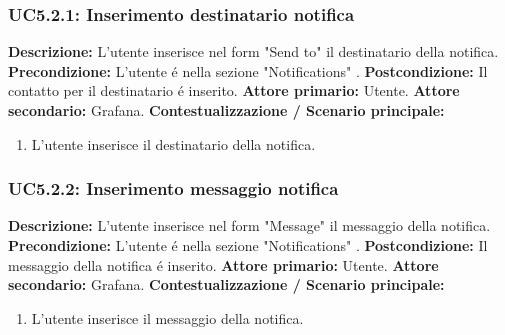                 \subsubsection{UC5.2.1: Inserimento destinatario notifica }
                    \textbf{Descrizione:} L’utente inserisce nel form "Send to" il destinatario della notifica.
                    \newline
                    \textbf{Precondizione:} L'utente é nella sezione "Notifications" .
                    \newline
                    \textbf{Postcondizione:} Il contatto per il destinatario é inserito.
                    \newline
                    \textbf{Attore primario:} Utente.
                    \newline
                    \textbf{Attore secondario:} Grafana.
                    \newline
                    \textbf{Contestualizzazione / Scenario principale:} \begin{enumerate}
                            \item L'utente inserisce il destinatario della notifica.
                        \end{enumerate}        
                
                
                \subsubsection{UC5.2.2: Inserimento messaggio notifica }
                    \textbf{Descrizione:} L’utente inserisce nel form "Message" il messaggio della notifica.
                    \newline
                    \textbf{Precondizione:} L'utente é nella sezione "Notifications" .
                    \newline
                    \textbf{Postcondizione:} Il messaggio della notifica é inserito.
                    \newline
                    \textbf{Attore primario:} Utente.
                    \newline
                    \textbf{Attore secondario:} Grafana.
                    \newline
                    \textbf{Contestualizzazione / Scenario principale:} \begin{enumerate}
                            \item L'utente inserisce il messaggio della notifica.
                        \end{enumerate} 
                 
